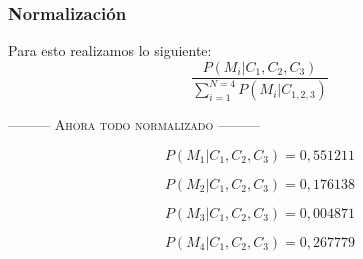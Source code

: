 \documentclass{beamer}
\begin{document}

\begin{frame}
\frametitle{Normalizaci\'on}
Para esto realizamos lo siguiente:
\begin{equation*}
\frac{P(M_{i}|C_{1}, C_{2}, C_{3})}{\sum_{i=1}^{N=4}P(M_{i}|C_{1, 2,
3})}
\end{equation*}

\begin{center}
\textsc{--------- Ahora todo normalizado ---------}
\end{center}
\begin{equation*}
P(M_{1}|C_{1}, C_{2}, C_{3}) = 0,551211
\end{equation*}

\begin{equation*}
P(M_{2}|C_{1}, C_{2}, C_{3}) = 0,176138
\end{equation*}

\begin{equation*}
P(M_{3}|C_{1}, C_{2}, C_{3}) = 0,004871
\end{equation*}

\begin{equation*}
P(M_{4}|C_{1}, C_{2}, C_{3}) = 0,267779
\end{equation*}
\end{frame}

\end{document}
